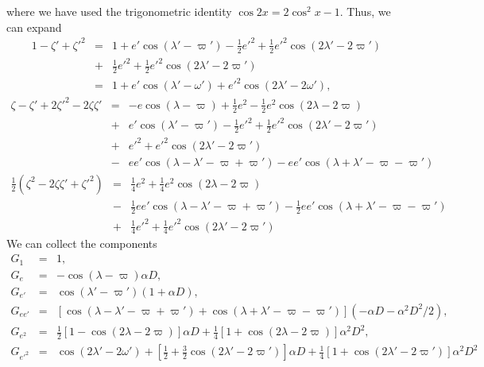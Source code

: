 \documentclass [12pt, a4paper] {article}
\begin{document}
where we have used the trigonometric identity $\cos 2x = 2\cos^2 x - 1$.
Thus, we can expand 
\begin {eqnarray}
    1 - \zeta' + \zeta'^2
    &=&
    1
    +
    e'\cos(\lambda' - \varpi')
    -
    \frac{1}{2}e'^2 
    + 
    \frac{1}{2}e'^2\cos(2\lambda' - 2\varpi')
    \\\nonumber 
    &+&
    \frac{1}{2}e'^2 + \frac{1}{2}e'^2\cos(2\lambda' - 2\varpi')
    \\
    &=&
    1
    +
    e'\cos(\lambda' - \omega')
    +
    e'^2\cos(2\lambda' - 2\omega'),
\end {eqnarray}
\begin {eqnarray}
    \zeta - \zeta' + 2\zeta'^2 - 2\zeta\zeta'
    &=&
    -e\cos(\lambda - \varpi)
    +
    \frac{1}{2}e^2 
    - 
    \frac{1}{2}e^2\cos(2\lambda - 2\varpi) 
    \\\nonumber 
    &+&
    e'\cos(\lambda' - \varpi')
    -
    \frac{1}{2}e'^2 
    + 
    \frac{1}{2}e'^2\cos(2\lambda' - 2\varpi')    
    \\\nonumber 
    &+&
    e'^2 + e'^2\cos(2\lambda' - 2\varpi')
    \\\nonumber 
    &-&
    ee'\cos(\lambda - \lambda' - \varpi + \varpi')
    -
    ee'\cos(\lambda + \lambda' - \varpi - \varpi')    
\end {eqnarray}
\begin {eqnarray}
    \frac{1}{2}(\zeta^2 - 2\zeta\zeta' + \zeta'^2)
    &=&
    \frac{1}{4}e^2 
    + 
    \frac{1}{4}e^2\cos(2\lambda - 2\varpi)
    \\\nonumber 
    &-&
    \frac{1}{2}ee'\cos(\lambda - \lambda' - \varpi + \varpi')
    -
    \frac{1}{2}ee'\cos(\lambda + \lambda' - \varpi - \varpi')    
    \\\nonumber
    &+&
    \frac{1}{4}e'^2 
    + 
    \frac{1}{4}e'^2\cos(2\lambda' - 2\varpi')
\end {eqnarray}
We can collect the components
\begin {eqnarray}
    G_1
    &=& 
    1, 
    \\
    G_e 
    &=& 
    - \cos(\lambda - \varpi)\alpha D,
    \\
    G_{e'}
    &=& 
    \cos(\lambda' - \varpi')(1 + \alpha D),
    \\
    G_{ee'}
    &=&
    \left[
        \cos(\lambda - \lambda' - \varpi + \varpi')
        +
        \cos(\lambda + \lambda' - \varpi - \varpi')    
    \right](-\alpha D - \alpha^2D^2/2),
    \\
    G_{e^2}
    &=&
    \frac{1}{2}
    \left[
        1 - \cos(2\lambda - 2\varpi)
    \right]\alpha D
    +
    \frac{1}{4}
    \left[
        1 + \cos(2\lambda - 2\varpi)
    \right]
    \alpha^2D^2,
    \\
    G_{e'^2}
    &=& 
   \cos(2\lambda' - 2\omega')
   + 
   \left[
        \frac{1}{2} 
        + 
        \frac{3}{2}\cos(2\lambda' - 2\varpi')
   \right]
   \alpha D 
   +
   \frac{1}{4}[1 + \cos(2\lambda' - 2\varpi')]
   \alpha^2 D^2
\end {eqnarray}
\end{document}
